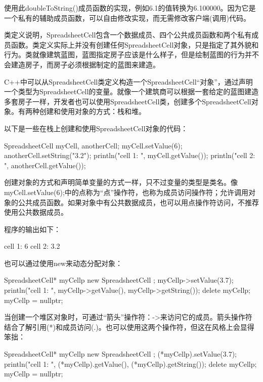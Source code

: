 使用此doubleToString()成员函数的实现，例如6.1的值转换为6.100000。因为它是一个私有的辅助成员函数，可以自由修改实现，而无需修改客户端(调用)代码。


类定义说明，SpreadsheetCell包含一个数据成员、四个公共成员函数和两个私有成员函数。类定义实际上并没有创建任何SpreadsheetCell对象，只是指定了其外貌和行为。类就像建筑蓝图，蓝图指定房子应该是什么样子，但是绘制蓝图的行为并不会建造房子，而房子必须根据制定的蓝图来建造。

C++中可以从SpreadsheetCell类定义构造一个SpreadsheetCell“对象”，通过声明一个类型为SpreadsheetCell的变量。就像一个建筑商可以根据一套给定的蓝图建造多套房子一样，开发者也可以使用SpreadsheetCell类，创建多个SpreadsheetCell对象。有两种创建和使用对象的方式：栈和堆。


以下是一些在栈上创建和使用SpreadsheetCell对象的代码：

\begin{cpp}
SpreadsheetCell myCell, anotherCell;
myCell.setValue(6);
anotherCell.setString("3.2");
println("cell 1: {}", myCell.getValue());
println("cell 2: {}", anotherCell.getValue());
\end{cpp}

创建对象的方式和声明简单变量的方式一样，只不过变量的类型是类名。像myCell.setValue(6);中的点称为“点”操作符，也称为成员访问操作符；允许调用对象的公共成员函数。如果对象中有公共数据成员，也可以用点操作符访问，不推荐使用公共数据成员。

程序的输出如下：

\begin{shell}
cell 1: 6
cell 2: 3.2
\end{shell}


也可以通过使用new来动态分配对象：

\begin{cpp}
SpreadsheetCell* myCellp { new SpreadsheetCell { } };
myCellp->setValue(3.7);
println("cell 1: {} {}", myCellp->getValue(), myCellp->getString());
delete myCellp;
myCellp = nullptr;
\end{cpp}

当创建一个堆区对象时，可通过“箭头”操作符：->来访问它的成员。箭头操作符结合了解引用(*)和成员访问(.)。也可以使用这两个操作符，但这在风格上会显得笨拙：

\begin{cpp}
SpreadsheetCell* myCellp { new SpreadsheetCell { } };
(*myCellp).setValue(3.7);
println("cell 1: {} {}", (*myCellp).getValue(), (*myCellp).getString());
delete myCellp;
myCellp = nullptr;
\end{cpp}

